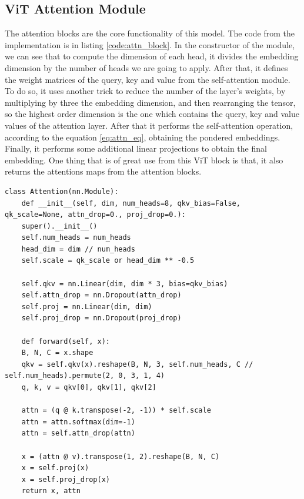 \subsection{ViT Attention Module}
The attention blocks are the core functionality of this model. The code from the implementation is in listing \ref{code:attn_block}. In the constructor of the module, we can see that to compute the dimension of each head, it divides the embedding dimension by the number of heads we are going to apply. After that, it defines the weight matrices of the query, key and value from the self-attention module. To do so, it uses another trick to reduce the number of the layer's weights, by multiplying by three the embedding dimension, and then rearranging the tensor, so the highest order dimension is the one which contains the query, key and value values of the attention layer. After that it performs the self-attention operation, according to the equation \ref{eq:attn_eq}, obtaining the pondered embeddings. Finally, it performs some additional linear projections to obtain the final embedding. One thing that is of great use from this ViT block is that, it also returns the attentions maps from the attention blocks.

\begin{lstlisting}[caption={Attention module for the ViT model}, label={code:attn_block}]
	class Attention(nn.Module):
	def __init__(self, dim, num_heads=8, qkv_bias=False, qk_scale=None, attn_drop=0., proj_drop=0.):
	super().__init__()
	self.num_heads = num_heads
	head_dim = dim // num_heads
	self.scale = qk_scale or head_dim ** -0.5
	
	self.qkv = nn.Linear(dim, dim * 3, bias=qkv_bias)
	self.attn_drop = nn.Dropout(attn_drop)
	self.proj = nn.Linear(dim, dim)
	self.proj_drop = nn.Dropout(proj_drop)
	
	def forward(self, x):
	B, N, C = x.shape
	qkv = self.qkv(x).reshape(B, N, 3, self.num_heads, C // self.num_heads).permute(2, 0, 3, 1, 4)
	q, k, v = qkv[0], qkv[1], qkv[2]
	
	attn = (q @ k.transpose(-2, -1)) * self.scale
	attn = attn.softmax(dim=-1)
	attn = self.attn_drop(attn)
	
	x = (attn @ v).transpose(1, 2).reshape(B, N, C)
	x = self.proj(x)
	x = self.proj_drop(x)
	return x, attn
\end{lstlisting}

